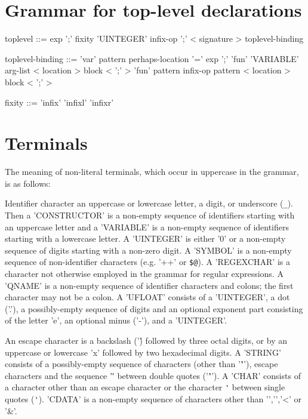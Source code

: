 \documentclass[11pt,a4paper]{article}
\begin{document}
\section{Grammar for top-level declarations}

\begin{grammar}
toplevel ::= exp ';'
             fixity 'UINTEGER' infix-op ';'
             < signature > toplevel-binding

toplevel-binding ::= 'var' pattern perhaps-location '=' exp ';'
                     'fun' 'VARIABLE' arg-list < location > block < ';' >
                     'fun' pattern infix-op pattern < location > block < ';' >

fixity ::= 'infix'
           'infixl'
           'infixr'
\end{grammar}

\section{Terminals}

\MakeShortVerb{\'}

The meaning of non-literal terminals, which occur in uppercase in the
grammar, is as follows:

Identifier character an uppercase or lowercase letter, a digit, or
underscore (\texttt{\_}).  Then a 'CONSTRUCTOR' is a non-empty sequence of
identifiers starting with an uppercase letter and a 'VARIABLE' is a
non-empty sequence of identifiers starting with a lowercase letter.  A
'UINTEGER' is either '0' or a non-empty sequence of digits starting with
a non-zero digit.  A 'SYMBOL' is a non-empty sequence of non-identifier
characters (e.g. '++' or \texttt{\$@}).  A 'REGEXCHAR' is a character not otherwise
employed in the grammar for regular expressions.  A 'QNAME' is a
non-empty sequence of identifier characters and colons; the first
character may not be a colon.  A 'UFLOAT' consists of a 'UINTEGER', a dot
('.'), a possibly-empty sequence of digits and an optional exponent part
consisting of the letter 'e', an optional minus ('-'), and a 'UINTEGER'.

An escape character is a backslash ('\') followed by three octal
digits, or by an uppercase or lowercase 'x' followed by two
hexadecimal digits.  A 'STRING' consists of a possibly-empty sequence of
characters (other than '"'), escape characters and the sequence '\"'
between double quotes ('"').  A 'CHAR' consists of a character other than
an escape character or the character \verb$'$ between single quotes (\verb$'$).
'CDATA' is a non-empty sequence of characters other than '{','}','<' or '&'.

\DeleteShortVerb{\'}
\end{document}
